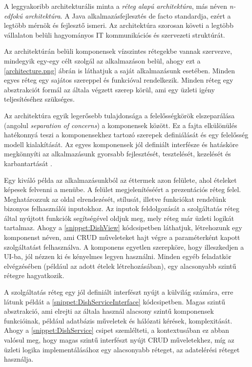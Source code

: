 A leggyakoribb architekturális minta a \emph{réteg alapú architektúra}, más néven \emph{n-edfokú architektúra}. A Java alkalmazásfejlesztés de facto standardja, ezért a legtöbb mérnök és fejlesztő ismeri. Az architektúra szorosan követi a legtöbb vállalaton belüli hagyományos IT kommunikációs és szervezeti struktúrát. \par

Az architektúrán belüli komponensek vízszintes rétegekbe vannak szervezve, mindegyik egy-egy célt szolgál az alkalmazáson belül, ahogy ezt a \ref{architecture.png} ábrán is láthatjuk a saját alkalmazásunk esetében. Minden egyes réteg egy sajátos szereppel és funkcióval rendelkezik. Minden réteg egy absztrakciót formál az általa végzett szerep körül, ami egy üzleti igény teljesítéséhez szükséges. \par

Az architektúra egyik legerősebb tulajdonsága a felelősségkörök elszeparálása (angolul \emph{separation of concerns}) a komponensek között. Ez a fajta elkülönülés hatékonnyá teszi a komponensekhez tartozó szerepek definiálását és egy felelősség modell kialakítását. Az egyes komponensek jól definiált interfésze és hatásköre megkönnyíti az alkalmazásunk gyorsabb fejlesztését, tesztelését, kezelését és karbantartását \cite{richards2015software}.\par

Egy kiváló példa az alkalmazásunkból az éttermek azon felülete, ahol ételeket képesek felvenni a menübe. A felület megjelenítéséért a prezentációs réteg felel. Meghatározzuk az oldal elrendezését, stílusát, illetve funkciókat rendelünk bizonyos felhasználói inputokhoz. Az inputok feldolgozását a szolgáltatás réteg által nyújtott funkciók segítségével oldjuk meg, mely réteg már üzleti logikát tartalmaz. Ahogy a \ref{snippet:DishView} kódcsipetben láthatjuk, létrehozunk egy komponenst  néven, ami CRUD műveleteket hajt végre a paraméterként kapott szolgáltatást felhasználva. A komponens egyetlen szerepköre, hogy illeszkedjen a UI-ba, jól nézzen ki és kényelmes legyen használni. Minden egyéb feladatkör elvégzésében (például az adott ételek létrehozásában), egy alacsonyabb szintű rétegre hagyatkozik. \par


A szolgáltatás réteg egy jól definiált interfészt nyújt a külvilág számára, erre látunk példát a \ref{snippet:DishServiceInterface} kódcsipetben. Magas szintű absztrakció, ami elrejti az általa használ alacsony szintű komponensek funkcióinak, például adatbázis műveletek és hálózati kérések, komplexitását. Ahogy a \ref{snippet:DishService} csipet szemlélteti, a  kontextusában ez abban valósul meg, hogy magas szintű interfészt nyújt CRUD műveletekhez, míg az üzleti logika implementálásához egy alacsonyabb réteget, az adatelérési réteget használja. \par


